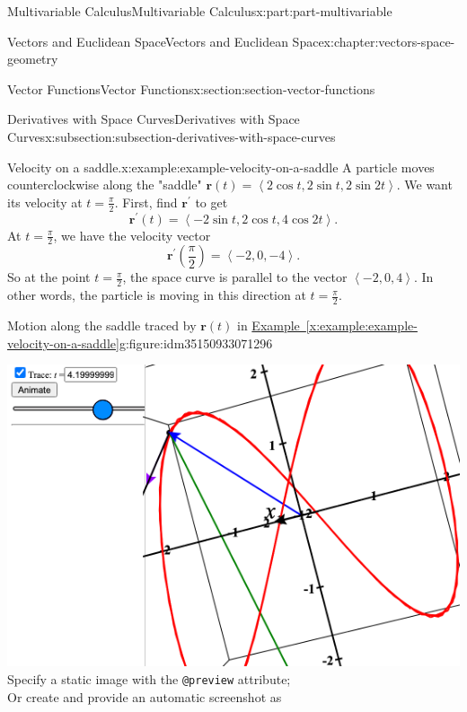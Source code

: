 \documentclass[twoside,10pt,]{book}
\newcommand{\xreffont}{\relax}
\newcommand{\mono}[1]{\texttt{#1}}
\numberwithin{equation}{part}
\newlength{\qrsize}
\newlength{\previewwidth}
\newcommand{\vb}[1]{\mathbf{#1}}
\newcommand{\dotprod}[1]{\left\langle #1 \right\rangle}
\begin{document}
\begin{partptx}{Multivariable Calculus}{}{Multivariable Calculus}{}{}{x:part:part-multivariable}
\begin{chapterptx}{Vectors and Euclidean Space}{}{Vectors and Euclidean Space}{}{}{x:chapter:vectors-space-geometry}
\begin{sectionptx}{Vector Functions}{}{Vector Functions}{}{}{x:section:section-vector-functions}
\begin{subsectionptx}{Derivatives with Space Curves}{}{Derivatives with Space Curves}{}{}{x:subsection:subsection-derivatives-with-space-curves}
\begin{example}{Velocity on a saddle.}{x:example:example-velocity-on-a-saddle}
A particle moves counterclockwise along the "saddle" \(\mathbf{r}(t) = \dotprod{2\cos t, 2\sin t, 2\sin 2t}\). We want its velocity at \(t=\frac{\pi}{2}\). First, find \(\mathbf{r}^\prime\) to get%
%
\begin{equation*}
\mathbf{r}^\prime(t) = \dotprod{-2\sin t,2\cos t,4\cos2t}.
\end{equation*}
At \(t=\frac{\pi}{2}\), we have the velocity vector%
%
\begin{equation*}
\mathbf{r}^\prime\left(\frac{\pi}{2}\right) = \dotprod{-2,0,-4}.
\end{equation*}
So at the point \(t=\frac{\pi}{2}\), the space curve is parallel to the vector \(\dotprod{-2,0,4}\). In other words, the particle is moving in this direction at \(t=\frac{\pi}{2}\).%
\end{example}
\begin{figureptx}{Motion along the saddle traced by \(\vb{r}(t)\) in \hyperref[x:example:example-velocity-on-a-saddle]{Example~{\xreffont\ref{x:example:example-velocity-on-a-saddle}}}}{g:figure:idm35150933071296}{}%
\centering
\setlength{\qrsize}{9em}
\setlength{\previewwidth}{\linewidth}
\addtolength{\previewwidth}{-\qrsize}
\begin{tcbraster}[raster columns=2, raster column skip=1pt, raster halign=center, raster force size=false, raster left skip=0pt, raster right skip=0pt]%
\begin{tcolorbox}[previewstyle, width=\previewwidth]%
%
{\includegraphics[width=0.80\linewidth,height=\qrsize,keepaspectratio]{generated/preview/calcplot3d-velocity-on-a-saddle-preview.png}}%
{\small{}Specify a static image with the \mono{@preview} attribute;\\%
Or create and provide an automatic screenshot as\\%
}
\end{tcolorbox}
\end{tcbraster}
\end{figureptx}
\end{subsectionptx}
\end{sectionptx}
\end{chapterptx}
\end{partptx}
\end{document}
